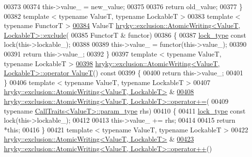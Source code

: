 \begin{DoxyCode}
{{{00373 
00374     this->value\_ = new\_value;
00375 
00376     \textcolor{keywordflow}{return} old\_value;
00377 \}
00382 \textcolor{keyword}{template} < \textcolor{keyword}{typename} ValueT, \textcolor{keyword}{typename} LockableT >
00383 \textcolor{keyword}{template} < \textcolor{keyword}{typename} FunctorT >
\hypertarget{exclusion__atomic_8h_source_l00384}{}\hyperlink{group__exclusion__control_gadd8b9f70d3ffa0442def7fca8fe2437c}{00384} ValueT \hyperlink{classhryky_1_1exclusion_1_1_atomic_writing}{hryky::exclusion::AtomicWriting<ValueT, LockableT>::exclude}(
00385     FunctorT & functor)
00386 \{
00387     \hyperlink{classhryky_1_1exclusion_1_1_lock}{lock_type} \textcolor{keyword}{const} lock(this->lockable\_);
00388 
00389     this->value\_ = functor(this->value\_);
00390     
00391     \textcolor{keywordflow}{return} this->value\_;
00392 \}
00397 \textcolor{keyword}{template} < \textcolor{keyword}{typename} ValueT, \textcolor{keyword}{typename} LockableT >
\hypertarget{exclusion__atomic_8h_source_l00398}{}\hyperlink{group__exclusion__control_ga3893c9d48406bce7b4b07cc0e4b7d20b}{00398} \hyperlink{classhryky_1_1exclusion_1_1_atomic_writing}{hryky::exclusion::AtomicWriting<ValueT, LockableT>::operator ValueT}()\textcolor{keyword}{ const}
00399 \textcolor{keyword}{}\{
00400     \textcolor{keywordflow}{return} this->value\_;
00401 \}
00406 \textcolor{keyword}{template} < \textcolor{keyword}{typename} ValueT, \textcolor{keyword}{typename} LockableT >
00407 \hyperlink{classhryky_1_1exclusion_1_1_atomic_writing}{hryky::exclusion::AtomicWriting<ValueT, LockableT>} & 
\hypertarget{exclusion__atomic_8h_source_l00408}{}\hyperlink{group__exclusion__control_gac0a6adb61a1a89d0a111bad5edb63eac}{00408} \hyperlink{classhryky_1_1exclusion_1_1_atomic_writing}{hryky::exclusion::AtomicWriting<ValueT, LockableT>::operator+=}(
00409     \textcolor{keyword}{typename} \hyperlink{classhryky_1_1_call_traits}{CallTraits<ValueT>::param_type} rhs)
00410 \{
00411     \hyperlink{classhryky_1_1exclusion_1_1_lock}{lock_type} \textcolor{keyword}{const} lock(this->lockable\_);
00412 
00413     this->value\_ += rhs;
00414     
00415     \textcolor{keywordflow}{return} *\textcolor{keyword}{this};
00416 \}
00421 \textcolor{keyword}{template} < \textcolor{keyword}{typename} ValueT, \textcolor{keyword}{typename} LockableT >
00422 \hyperlink{classhryky_1_1exclusion_1_1_atomic_writing}{hryky::exclusion::AtomicWriting<ValueT, LockableT>} & 
\hypertarget{exclusion__atomic_8h_source_l00423}{}\hyperlink{group__exclusion__control_gaa75c713c9c844df689e0ef44d9cf074e}{00423} \hyperlink{classhryky_1_1exclusion_1_1_atomic_writing}{hryky::exclusion::AtomicWriting<ValueT, LockableT>::operator++}()
}}}
\end{DoxyCode}
